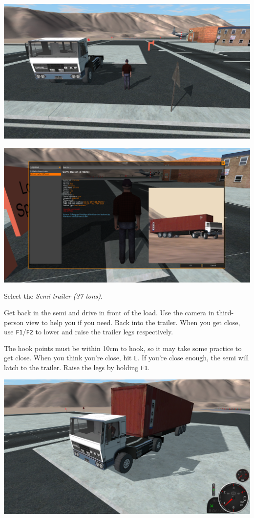 \includegraphics{images/bg-daf2.png}

\includegraphics{images/bg-loadselect.png}

Select the \emph{Semi trailer (37 tons)}.

Get back in the semi and drive in front of the load. Use the camera in
third-person view to help you if you need. Back into the trailer. When
you get close, use \texttt{F1}/\texttt{F2} to lower and raise the
trailer legs respectively.

The hook points must be within 10cm to hook, so it may take some
practice to get close. When you think you're close, hit \texttt{L}. If
you're close enough, the semi will latch to the trailer. Raise the legs
by holding \texttt{F1}.


\includegraphics{images/bg-daf3.png}

